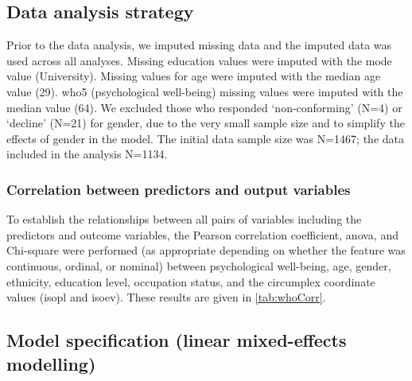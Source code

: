 \subsection{Data analysis strategy}

Prior to the data analysis, we imputed missing data and the imputed data was used across all analyses. Missing education values were imputed with the mode value (University). Missing values for age were imputed with the median age value (29). \gls{who5} (psychological well-being) missing values were imputed with the median value (64). We excluded those who responded `non-conforming' (N=4) or `decline' (N=21) for gender, due to the very small sample size and to simplify the effects of gender in the model. The initial data sample size was N=1467; the data included in the analysis N=1134.

\subsubsection*{Correlation between predictors and output variables}
To establish the relationships between all pairs of variables including the predictors and outcome variables, the Pearson correlation coefficient, \gls{anova}, and Chi-square were performed (as appropriate depending on whether the feature was continuous, ordinal, or nominal) between psychological well-being, age, gender, ethnicity, education level, occupation status, and the circumplex coordinate values (\gls{isopl} and \gls{isoev}). These results are given in \cref{tab:whoCorr}.

\subsection{Model specification (linear mixed-effects modelling)}

